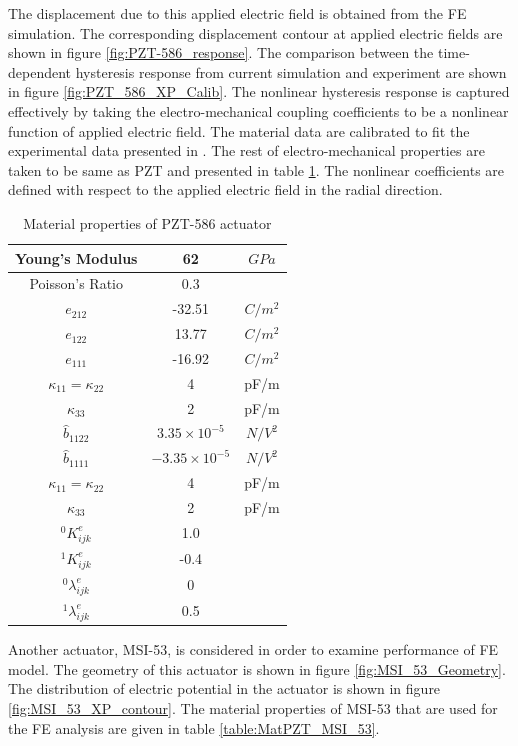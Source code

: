 The displacement due to this applied electric field is obtained from the FE simulation. 
The corresponding displacement contour at applied electric fields are shown in figure \ref{fig:PZT-586_response}. 
The comparison between the time-dependent hysteresis response from current simulation and experiment are shown in figure \ref{fig:PZT_586_XP_Calib}. 
The nonlinear hysteresis response is captured effectively by taking the electro-mechanical coupling coefficients to be a nonlinear function of applied electric field. 
The material data are calibrated to fit the experimental data presented in \cite{Alexander,Alexander2003}. 
The rest of electro-mechanical properties are taken to be same as PZT and presented in table \ref{table:MatPZT_PZT_586}. 
The nonlinear coefficients are defined with respect to the applied electric field in the radial direction.
\begin{table}
\caption{Material properties of PZT-586 actuator \cite{Alexander}}
\centering
\begin{tabular}{c c c} \hline
Young's Modulus&62& $GPa$\\ \hline
Poisson's Ratio&0.3& \\  
$e_{212}$ &-32.51&$C/m^2$\\ 
$e_{122}$ &13.77&$C/m^2$\\ 
$e_{111}$ & -16.92&$C/m^2$\\ 
$\kappa_{11}=\kappa_{22}$ & 4 &pF/m\\ 
$\kappa_{33}$ & 2 &pF/m\\ 
$\widehat{b}_{1122}$ & $3.35 \times 10^{-5}$ &  $ N/V^2 $\\ 
$\widehat{b}_{1111} $ & $-3.35 \times 10^{-5}$ &$ N/V^2 $\\ 
$\kappa_{11}=\kappa_{22}$ & 4 &pF/m\\ 
$\kappa_{33}$ & 2 &pF/m\\ 
${}^{0}K_{ijk}^{e}$&1.0&\\ 
${}^{1}K_{ijk}^{e}$&-0.4&\\ 
${}^{0}\lambda_{ijk}^{e}$&0&\\ 
${}^{1}\lambda_{ijk}^{e}$&0.5&\\ \hline 
\end{tabular}
\label{table:MatPZT_PZT_586}
\end{table}
Another actuator, MSI-53, is considered in order to examine performance of FE model. 
The geometry of this actuator is shown in figure \ref{fig:MSI_53_Geometry}. 
The distribution of electric potential in the actuator is shown in figure \ref{fig:MSI_53_XP_contour}. 
The material properties of MSI-53 that are used for the FE analysis are given in table \ref{table:MatPZT_MSI_53}. 
